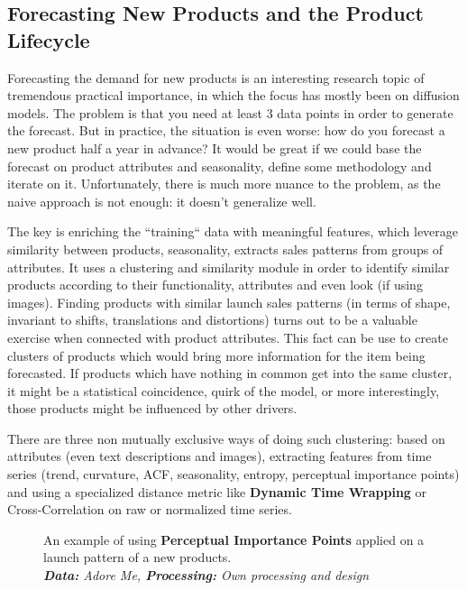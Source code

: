 \documentclass[12pt]{article}
\begin{document}
\subsection{Forecasting New Products and the Product Lifecycle}

Forecasting the demand for new products is an interesting research topic of tremendous practical importance, in which the focus has mostly been on diffusion models. The problem is that you need at least 3 data points in order to generate the forecast. But in practice, the situation is even worse: how do you forecast a new product half a year in advance? It would be great if we could base the forecast on product attributes and seasonality, define some methodology and iterate on it. Unfortunately, there is much more nuance to the problem, as the naive approach is not enough: it doesn't generalize well.


The key is enriching the ``training`` data with meaningful features, which leverage similarity between products, seasonality, extracts sales patterns from groups of attributes. It uses a clustering and similarity module in order to identify similar products according to their functionality, attributes and even look (if using images). Finding products with similar launch sales patterns (in terms of shape, invariant to shifts, translations and distortions) turns out to be a valuable exercise when connected with product attributes. This fact can be use to create clusters of products which would bring more information for the item being forecasted. If products which have nothing in common get into the same cluster, it might be a statistical coincidence, quirk of the model, or more interestingly, those products might be influenced by other drivers.

There are three non mutually exclusive ways of doing such clustering: based on attributes (even text descriptions and images), extracting features from time series (trend, curvature, ACF, seasonality, entropy, perceptual importance points) and using a specialized distance metric like \textbf{Dynamic Time Wrapping} or Cross-Correlation on raw or normalized time series.


\begin{figure}[ht!]%
	\centering
	\qquad
	\caption{An example of using \textbf{Perceptual Importance Points} applied on a launch pattern of a new products.\\
		\textit{\textbf{Data:} Adore Me, \textbf{Processing:} Own processing and design}}
	\label{fig:pip}%
\end{figure}
\end{document}
